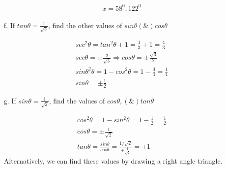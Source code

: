 \documentclass{article}
\begin{document}
\begin{enumerate}
        \[
        \begin{aligned}
          x = 58^{0}, 122^{0}
        \end{aligned}
        \]
  \item[f.] If $tan\theta = \frac{1}{\sqrt{3}}$, find the other values of $sin\theta (\&) cos\theta$

        \[
        \begin{aligned}
          sec^{2}\theta = tan^{2}\theta + 1 = \frac{1}{3}+1 = \frac{4}{3} \\
          sec\theta = \pm\frac{2}{\sqrt{3}} \Rightarrow cos\theta = \pm \frac{\sqrt{3}}{2} \\
          sin\theta^{2}\theta = 1 - cos^{2}\theta = 1 - \frac{3}{4} = \frac{1}{4} \\
          sin\theta = \pm\frac{1}{2}
        \end{aligned}
        \]
  \item[g.] If $sin\theta = \frac{1}{\sqrt{2}}$, find the values of $cos\theta, (\&) tan\theta$

        \[
        \begin{aligned}
          cos^{2}\theta = 1 - sin^{2}\theta = 1 - \frac{1}{2} = \frac{1}{2} \\
          cos\theta = \pm\frac{1}{\sqrt{2}} \\
          tan\theta = \frac{sin\theta}{cos\theta} = \frac{1/\sqrt{2}}{\pm\frac{1}{\sqrt{2}}} = \pm 1
        \end{aligned}
        \]
        Alternatively, we can find these values by drawing a right angle triangle.

        \begin{center}
        \end{center}


\end{enumerate}
\end{document}
